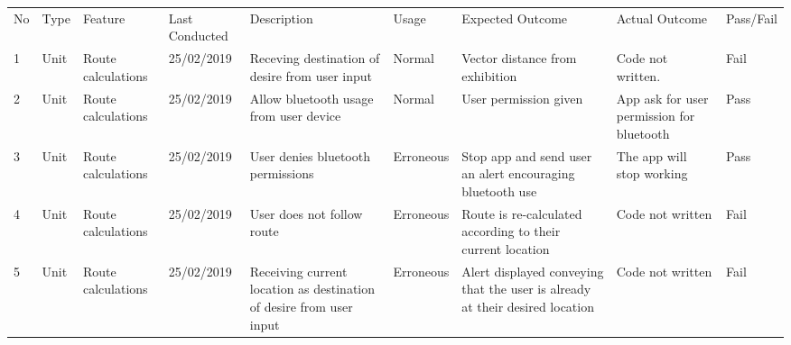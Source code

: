 \newpage
\begin{adjustbox}{angle=90}
\begin{tabular}{l|l|l|l|p{3cm}|l|p{3cm}|p{3cm}|l}
No      & Type                          & Feature            & Last Conducted & Description                                                                   & Usage     & Expected Outcome                                                             & Actual Outcome                                                              & Pass/Fail   \\
1       & Unit                          & Route calculations & 25/02/2019     & Receving destination of desire from user input                                & Normal    & Vector distance from exhibition                                              & Code not written.                                                           & Fail        \\
2       & Unit                          & Route calculations & 25/02/2019     & Allow bluetooth usage from user device                                        & Normal    & User permission given                                                        & App ask for user permission for bluetooth                                   & Pass        \\
3       & Unit                          & Route calculations & 25/02/2019     & User denies bluetooth permissions                                             & Erroneous & Stop app and send user an alert encouraging bluetooth use                    & The app will stop working                                                   & Pass        \\
4       & Unit                          & Route calculations & 25/02/2019     & User does not follow route                                                    & Erroneous & Route is re-calculated according to their current location                   & Code not written                                                            & Fail        \\
5       & Unit                          & Route calculations & 25/02/2019     & Receiving current location as destination of desire from user input           & Erroneous & Alert displayed conveying that the user is already at their desired location & Code not written                                                            & Fail        \\

\end{tabular}
\end{adjustbox}
